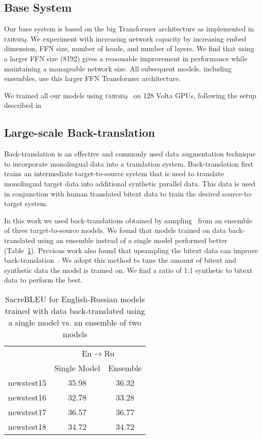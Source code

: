 \documentclass[11pt,a4paper]{article}
\newcommand{\fairseq}{\textsc{fairseq}}
\newcommand{\entoru}{En$\rightarrow$Ru}
\begin{document}
\subsection{Base System}
Our base system is based on the big Transformer architecture \cite{vaswani2017attention} as implemented in \fairseq{}. 
We experiment with increasing network capacity by increasing embed dimension, FFN size, number of heads, and number of layers.
We find that using a larger FFN size (8192) gives a reasonable improvement in performance while maintaining a manageable network size. 
All subsequent models, including ensembles, use this larger FFN Transformer architecture.

We trained all our models using \fairseq{}~\cite{ott2019fairseq} on 128 Volta GPUs, following the setup described in~\citet{ott:scaling:2018}

\subsection{Large-scale Back-translation}
Back-translation is an effective and commonly used data augmentation technique to incorporate monolingual data into a translation system. 
Back-translation first trains an intermediate target-to-source system that is used to translate monolingual target data into additional synthetic parallel data.  
This data is used in conjunction with human translated bitext data to train the desired source-to-target system. 

In this work we used back-translations obtained by sampling~\cite{edunov2018understanding} from an ensemble of three target-to-source models. 
We found that models trained on data back-translated using an ensemble instead of a single model performed better (Table~\ref{tab:bt_ensemble_vs_single}). 
Previous work also found that upsampling the bitext data can improve back-translation~\citep{edunov2018understanding}.
We adopt this method to tune the amount of bitext and synthetic data the model is trained on.
We find a ratio of 1:1 synthetic to bitext data to perform the best.

\begin{table}[t]
\centering
\begin{tabular}{lcc}
\toprule
& \multicolumn{2}{c}{\entoru{}} \\
& Single Model & Ensemble \\ \midrule
newstest15 & 35.98 & 36.32 \\
newstest16 & 32.78 & 33.28 \\
newstest17 & 36.57 & 36.77 \\
newstest18 & 34.72 & 34.72 \\
\bottomrule
\end{tabular}
\caption{SacreBLEU for English-Russian models trained with data back-translated using a single model vs. an ensemble of two models}
\label{tab:bt_ensemble_vs_single}
\end{table}
\end{document}

